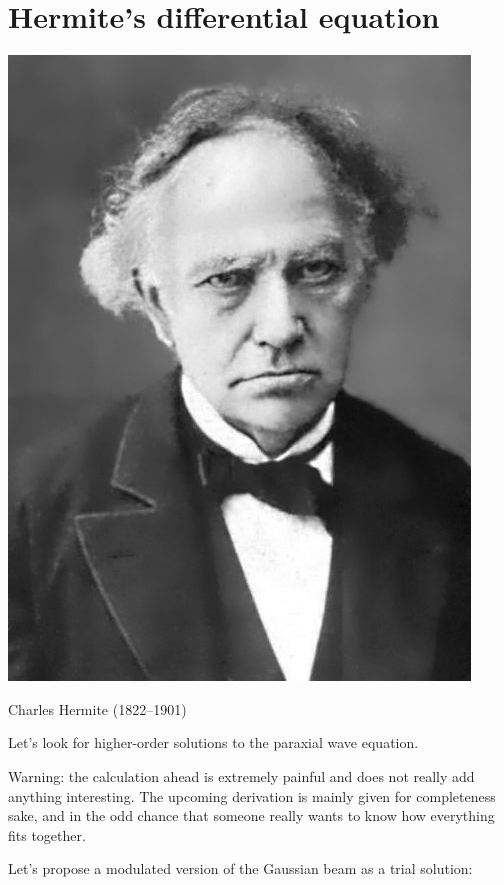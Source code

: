 \pagebreak

\section{Hermite's differential equation}

\begin{marginfigure}[0.4cm]
  \includegraphics{hermite/figures/c_hermite}
  \caption{Charles Hermite (1822–1901)}
  \end{marginfigure}

Let's look for higher-order solutions to the paraxial wave equation. 

Warning: the calculation ahead is extremely painful and does not really add anything interesting. The upcoming derivation is mainly given for completeness sake, and in the odd chance that someone really wants to know how everything fits together.

Let's propose a modulated version of the Gaussian beam as a trial solution:

